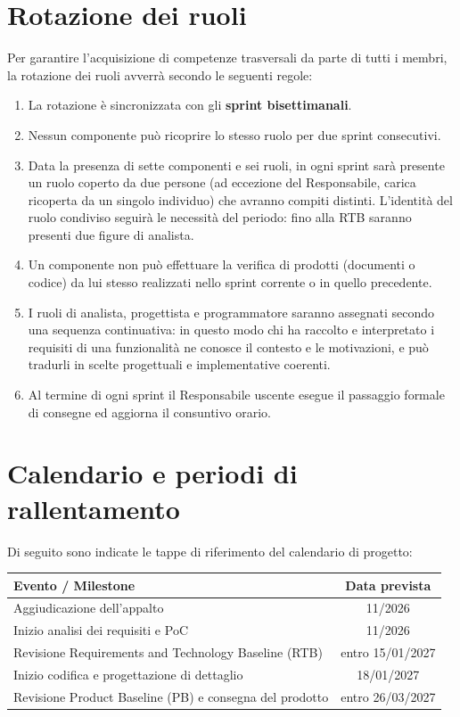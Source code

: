 \section{Rotazione dei ruoli}
Per garantire l'acquisizione di competenze trasversali da parte di tutti i membri, la rotazione dei ruoli avverrà secondo le seguenti regole:
\begin{enumerate}
    \item La rotazione è sincronizzata con gli \textbf{sprint bisettimanali}.
    \item Nessun componente può ricoprire lo stesso ruolo per due sprint consecutivi.
    \item Data la presenza di sette componenti e sei ruoli, in ogni sprint sarà presente un ruolo coperto da due persone (ad eccezione del Responsabile, carica ricoperta da un singolo individuo) che avranno compiti distinti. L'identità del ruolo condiviso seguirà le necessità del periodo: fino alla RTB saranno presenti due figure di analista.
    \item Un componente non può effettuare la verifica di prodotti (documenti o codice) da lui stesso realizzati nello sprint corrente o in quello precedente.
    \item I ruoli di analista, progettista e programmatore saranno assegnati secondo una sequenza continuativa: in questo modo chi ha raccolto e interpretato i requisiti di una funzionalità ne conosce il contesto e le motivazioni, e può tradurli in scelte progettuali e implementative coerenti.
    \item Al termine di ogni sprint il Responsabile uscente esegue il passaggio formale di consegne ed aggiorna il consuntivo orario.
    
\end{enumerate}

\section {Calendario e periodi di rallentamento}
Di seguito sono indicate le tappe di riferimento del calendario di progetto:

\vspace{2mm}
\noindent
\begin{tabularx}{\textwidth}{|X c|}
\hline
\textbf{Evento / Milestone} & \textbf{Data prevista} \\
\hline
Aggiudicazione dell'appalto & 11/2026 \\
\hline
Inizio analisi dei requisiti e PoC & 11/2026 \\
\hline
Revisione Requirements and Technology Baseline (RTB) & entro 15/01/2027 \\
\hline
Inizio codifica e progettazione di dettaglio & 18/01/2027 \\
\hline
Revisione Product Baseline (PB) e consegna del prodotto & entro 26/03/2027 \\
\hline
\end{tabularx}

